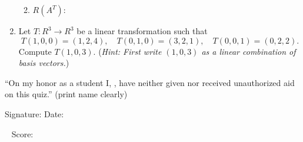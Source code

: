 \documentclass[fleqn,12pt]{article}
\begin{document}
\begin{enumerate}
\begin{enumerate}
    \newpage

  \item
    $R(A^T)$:

    \vskip1cm
    \hfill{}
    \vskip2cm
  \end{enumerate}
\item
  Let 
  $T: R^3 \rightarrow R^3$
  be a linear transformation such that 
  \[      T(1, 0, 0) = (1, 2, 4), \quad 
  T(0, 1, 0) = (3, 2, 1), \quad
  T(0, 0, 1) = (0, 2, 2).
  \]
  Compute $T(1, 0, 3)$. 
  ({\it Hint: First write $(1,0,3)$ as a linear combination of basis vectors.})

  \vskip6cm


\end{enumerate}

\vfill
\noindent 
``On my honor as a student I,
\underline{\phantom{XXXXXXXXXXXXXXXXXXXXX}}, have neither
given nor received unauthorized aid on this quiz.''
\hbox{} \hskip 1cm {\small (print name clearly)}\\[4pt]
\begin{flushright} Signature: \underline{\phantom{XXXXXXXXXXXXXXXXXXXXXXXX}}
  Date: \underline{\phantom{XXXXXXXXXX}}
\end{flushright}
\vskip5mm
~ \hfill Score: \phantom{XXXXXX}
\end{document}
